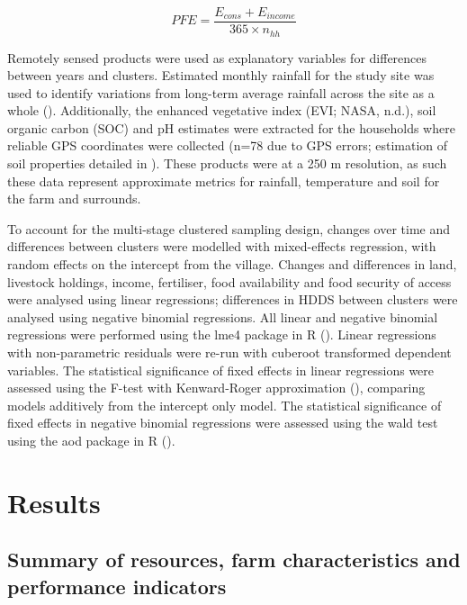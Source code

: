 \begin{equation}
\tag{4.1}
PFE = \frac{E_{cons} + E_{income}}{365 \times n_{hh}}
\end{equation}

Remotely sensed products were used as explanatory variables for differences between years and clusters. Estimated monthly rainfall for the study site was used to identify variations from long-term average rainfall across the site as a whole (\citealp{Janowiak1999}). Additionally, the enhanced vegetative index (EVI; NASA, n.d.), soil organic carbon (SOC) and pH estimates were extracted for the households where reliable GPS coordinates were collected (n=78 due to GPS errors; estimation of soil properties detailed in \citealp{Hengl2016}). These products were at a 250 m resolution, as such these data represent approximate metrics for rainfall, temperature and soil for the farm and surrounds.

To account for the multi-stage clustered sampling design, changes over time and differences between clusters were modelled with mixed-effects regression, with random effects on the intercept from the village. Changes and differences in land, livestock holdings, income, fertiliser, food availability and food security of access were analysed using linear regressions; differences in HDDS between clusters were analysed using negative binomial regressions. All linear and negative binomial regressions were performed using the lme4 package in R (\citealp{BatesD2017}). Linear regressions with non-parametric residuals were re-run with cuberoot transformed dependent variables. The statistical significance of fixed effects in linear regressions were assessed using the F-test with Kenward-Roger approximation (\citealp{Kenward1997}), comparing models additively from the intercept only model. The statistical significance of fixed effects in negative binomial regressions were assessed using the wald test using the aod package in R (\citealp{Lesnoff2012}).

\section{Results}

\subsection{Summary of resources, farm characteristics and performance indicators}

